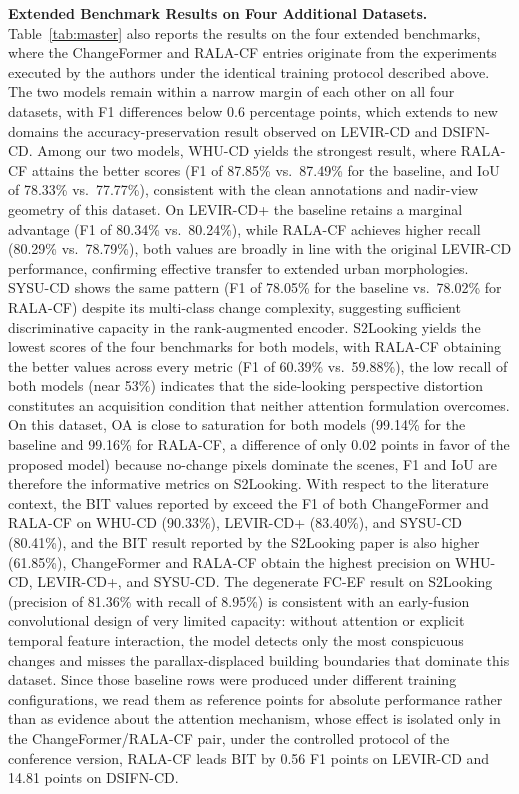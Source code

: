 \documentclass[runningheads]{llncs}
\newcommand{\journal}[1]{{\color{orange}#1}}
\begin{document}
\journal{%
\noindent \textbf{Extended Benchmark Results on Four Additional Datasets.}
Table~\ref{tab:master} also reports the results on the four extended
benchmarks, where the ChangeFormer and RALA-CF entries originate from the
experiments executed by the authors under the identical training protocol
described above.
The two models remain within a narrow margin of each other on all four
datasets, with F1 differences below 0.6 percentage points, which extends to
new domains the accuracy-preservation result observed on LEVIR-CD and DSIFN-CD.
Among our two models, WHU-CD yields the strongest result, where RALA-CF
attains the better scores (F1 of 87.85\% vs.\ 87.49\% for the baseline, and
IoU of 78.33\% vs.\ 77.77\%), consistent with the clean annotations and
nadir-view geometry of this dataset.
On LEVIR-CD+ the baseline retains a marginal advantage
(F1 of 80.34\% vs.\ 80.24\%), while RALA-CF achieves higher recall
(80.29\% vs.\ 78.79\%), both values are broadly in line with the original
LEVIR-CD performance, confirming effective transfer to extended urban
morphologies.
SYSU-CD shows the same pattern (F1 of 78.05\% for the baseline vs.\ 78.02\%
for RALA-CF) despite its multi-class change complexity, suggesting sufficient
discriminative capacity in the rank-augmented encoder.
S2Looking yields the lowest scores of the four benchmarks for both models,
with RALA-CF obtaining the better values across every metric
(F1 of 60.39\% vs.\ 59.88\%), the low recall of both models (near 53\%)
indicates that the side-looking perspective distortion constitutes an
acquisition condition that neither attention formulation overcomes.
On this dataset, OA is close to saturation for both models (99.14\% for the
baseline and 99.16\% for RALA-CF, a difference of only 0.02 points in favor
of the proposed model) because no-change pixels dominate the scenes, F1 and
IoU are therefore the informative metrics on S2Looking.
With respect to the literature context, the BIT values reported by
\cite{Chen2024ChangeMamba} exceed the F1 of both ChangeFormer and RALA-CF on
WHU-CD (90.33\%), LEVIR-CD+ (83.40\%), and SYSU-CD (80.41\%), and the BIT
result reported by the S2Looking paper \cite{ShenS2Looking2021} is also higher
(61.85\%), ChangeFormer and RALA-CF obtain the highest precision on WHU-CD,
LEVIR-CD+, and SYSU-CD.
The degenerate FC-EF result on S2Looking (precision of 81.36\% with recall of
8.95\%) is consistent with an early-fusion convolutional design of very
limited capacity: without attention or explicit temporal feature interaction,
the model detects only the most conspicuous changes and misses the
parallax-displaced building boundaries that dominate this dataset.
Since those baseline rows were produced under different training
configurations, we read them as reference points for absolute performance
rather than as evidence about the attention mechanism, whose effect is
isolated only in the ChangeFormer/RALA-CF pair, under the controlled protocol
of the conference version, RALA-CF leads BIT by 0.56 F1 points on LEVIR-CD and
14.81 points on DSIFN-CD.
}
\end{document}
